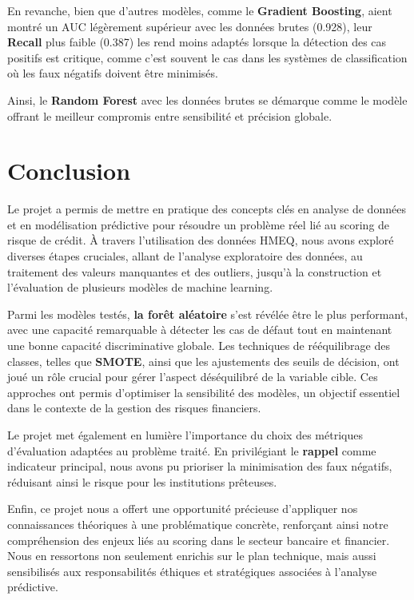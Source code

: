 \documentclass[a4paper,12pt]{report}
\begin{document}
\bigbreak

En revanche, bien que d'autres modèles, comme le \textbf{Gradient Boosting}, aient montré un AUC légèrement supérieur avec les données brutes (0.928), leur \textbf{Recall} plus faible (0.387) les rend moins adaptés lorsque la détection des cas positifs est critique, comme c'est souvent le cas dans les systèmes de classification où les faux négatifs doivent être minimisés. 

Ainsi, le \textbf{Random Forest} avec les données brutes se démarque comme le modèle offrant le meilleur compromis entre sensibilité et précision globale.

\pagebreak

\section*{Conclusion}

Le projet a permis de mettre en pratique des concepts clés en analyse de données et en modélisation prédictive pour résoudre un problème réel lié au scoring de risque de crédit. À travers l'utilisation des données HMEQ, nous avons exploré diverses étapes cruciales, allant de l'analyse exploratoire des données, au traitement des valeurs manquantes et des outliers, jusqu’à la construction et l’évaluation de plusieurs modèles de machine learning.

Parmi les modèles testés, \textbf{la forêt aléatoire} s'est révélée être le plus performant, avec une capacité remarquable à détecter les cas de défaut tout en maintenant une bonne capacité discriminative globale. Les techniques de rééquilibrage des classes, telles que \textbf{SMOTE}, ainsi que les ajustements des seuils de décision, ont joué un rôle crucial pour gérer l’aspect déséquilibré de la variable cible. Ces approches ont permis d'optimiser la sensibilité des modèles, un objectif essentiel dans le contexte de la gestion des risques financiers.

\bigbreak

Le projet met également en lumière l'importance du choix des métriques d’évaluation adaptées au problème traité. En privilégiant le \textbf{rappel} comme indicateur principal, nous avons pu prioriser la minimisation des faux négatifs, réduisant ainsi le risque pour les institutions prêteuses.

Enfin, ce projet nous a offert une opportunité précieuse d’appliquer nos connaissances théoriques à une problématique concrète, renforçant ainsi notre compréhension des enjeux liés au scoring dans le secteur bancaire et financier. Nous en ressortons non seulement enrichis sur le plan technique, mais aussi sensibilisés aux responsabilités éthiques et stratégiques associées à l’analyse prédictive.
\end{document}
